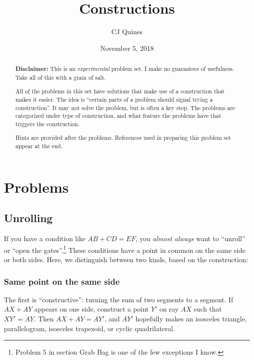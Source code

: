 \documentclass[11pt,paper=letter]{scrartcl}
\begin{document}
\title{Constructions}
\author{CJ Quines}
\date{November 5, 2018}

\maketitle

\begin{abstract}

\noindent\textbf{Disclaimer:} This is an \emph{experimental} problem set. I make no guarantees of usefulness. Take all of this with a grain of salt.

All of the problems in this set have solutions that make use of a construction that makes it easier. The idea is ``certain parts of a problem should signal trying a construction''. It may not solve the problem, but is often a key step. The problems are categorized under type of construction, and what feature the problems have that triggers the construction.

Hints are provided after the problems. References used in preparing this problem set appear at the end.

\end{abstract}

\section{Problems}

\subsection{Unrolling}

If you have a condition like $AB + CD = EF$, you \emph{almost always} want to ``unroll'' or ``open the gates''.\footnote{Problem 5 in section Grab Bag is one of the few exceptions I know.} These conditions have a point in common on the same side or both sides. Here, we distinguish between two kinds, based on the construction:

\subsubsection*{Same point on the same side}

The first is ``constructive'': turning the sum of two segments to a segment. If $AX + AY$ appears on one side, construct a point $Y'$ on ray $AX$ such that $XY' = AY$. Then $AX + AY = AY'$, and $AY'$ hopefully makes an isosceles triangle, parallelogram, isosceles trapezoid, or cyclic quadrilateral.
\end{document}
